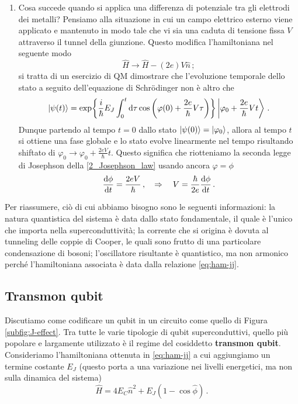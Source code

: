 \begin{enumerate}
    
    \item Cosa succede quando si applica una differenza di potenziale tra gli elettrodi dei metalli? Pensiamo alla situazione in cui un campo elettrico esterno viene applicato e mantenuto in modo tale che vi sia una caduta di tensione fissa $V$ attraverso il tunnel della giunzione. Questo modifica l'hamiltoniana nel seguente modo
    \begin{equation*}
        \hat H \longrightarrow \hat H -(2e)V\hat n \, ;
    \end{equation*}
    si tratta di un esercizio di QM dimostrare che l'evoluzione temporale dello stato a seguito dell'equazione di Schr\"odinger non è altro che 
    \begin{equation*}
        \ket{\psi(t)}=\exp{\frac{i}{\hbar}E_J\int_0^t\dd{\tau}\cos\left(\varphi(0)+\frac{2e}{\hbar}V\tau\right)}\ket{\varphi_0+\frac{2e}{\hbar}Vt} \, .
    \end{equation*}
    Dunque partendo al tempo $t=0$ dallo stato $\ket{\psi(0)} = \ket{\varphi_0}$, allora al tempo $t$ si ottiene una fase globale e lo stato evolve linearmente nel tempo risultando shiftato di $\varphi_0 \to \varphi_0 + \frac{2 e V}{\hbar} t$. Questo significa che riotteniamo la seconda legge di Josephson della \eqref{2_Josephson_law} usando ancora $\varphi=\phi$
    \begin{equation*}
        \dv{\phi}{t} = \frac{2 e V}{\hbar} \, , \quad \Rightarrow \quad V = \frac{\hbar}{2 e} \dv{\phi}{t} \, . 
    \end{equation*}
\end{enumerate}

\noindent Per riassumere, ciò di cui abbiamo bisogno sono le seguenti informazioni: la natura quantistica del sistema è data dallo stato fondamentale, il quale è l'unico che importa nella superconduttività; la corrente che si origina è dovuta al tunneling delle coppie di Cooper, le quali sono frutto di una particolare condensazione di bosoni; l'oscillatore risultante è quantistico, ma non armonico perché l'hamiltoniana associata è data dalla relazione \eqref{eq:ham-jj}. 

\subsection{Transmon qubit}
Discutiamo come codificare un qubit in un circuito come quello di Figura \ref{subfig:J-effect}. Tra tutte le varie tipologie di qubit superconduttivi, quello più popolare e largamente utilizzato è il regime del cosiddetto \textbf{transmon qubit}. Consideriamo l'hamiltoniana ottenuta in \eqref{eq:ham-jj} a cui aggiungiamo un termine costante $E_J$ (questo porta a una variazione nei livelli energetici, ma non sulla dinamica del sistema)
\begin{equation*}
    \hat H = 4E_C\hat n^2 + E_J(1-\cos\hat\phi) \, .
\end{equation*}

